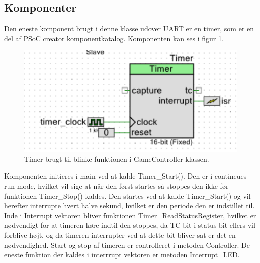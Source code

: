 \documentclass[Softwaredesign/Softwaredesign_main.tex]{subfiles}
\begin{document}
\subsection{Komponenter}
Den eneste komponent brugt i denne klasse udover UART er en timer, som er en del af PSoC creator komponentkatalog. Komponenten kan ses i figur \ref{fig:Timer}.
\begin{figure}
    \centering 
    \includegraphics[width=\linewidth]{Softwaredesign/GameController/graphic/gamecontroller_timer.PNG}
    \caption{Timer brugt til blinke funktionen i GameController klassen.}
    \label{fig:Timer}
\end{figure}
Komponenten initieres i main ved at kalde Timer\_Start(). Den er i contineues run mode, hvilket vil sige at når den først startes så stoppes den ikke før funktionen Timer\_Stop() kaldes. Den startes ved at kalde Timer\_Start() og vil herefter interrupte hvert halve sekund, hvilket er den periode den er indstillet til. Inde i Interrupt vektoren bliver funktionen Timer\_ReadStatusRegister, hvilket er nødvendigt for at timeren køre indtil den stoppes, da TC bit i status bit ellers vil forblive højt, og da timeren interrupter ved at dette bit bliver sat er det en nødvendighed. Start og stop af timeren er controlleret i metoden Controller. De eneste funktion der kaldes i interrrupt vektoren er metoden Interrupt\_LED. 
\end{document}

